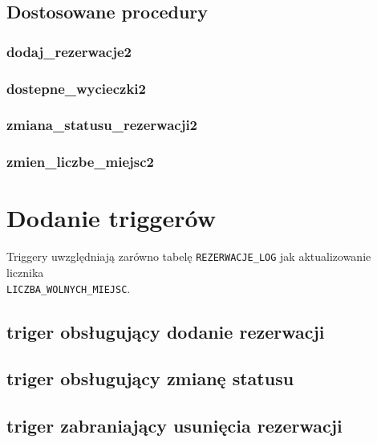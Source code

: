 \documentclass[12pt]{article}
\begin{document}
\subsection{Dostosowane procedury}

\subsubsection{dodaj\_rezerwacje2}


\subsubsection{dostepne\_wycieczki2}



\subsubsection{zmiana\_statusu\_rezerwacji2}



\subsubsection{zmien\_liczbe\_miejsc2}


\section{Dodanie triggerów}
Triggery uwzględniają zarówno tabelę \texttt{REZERWACJE\_LOG} jak aktualizowanie licznika \\ \texttt{LICZBA\_WOLNYCH\_MIEJSC}.

\subsection{triger obsługujący dodanie rezerwacji}



\subsection{triger obsługujący zmianę statusu}


\subsection{triger zabraniający usunięcia rezerwacji}

\end{document}
